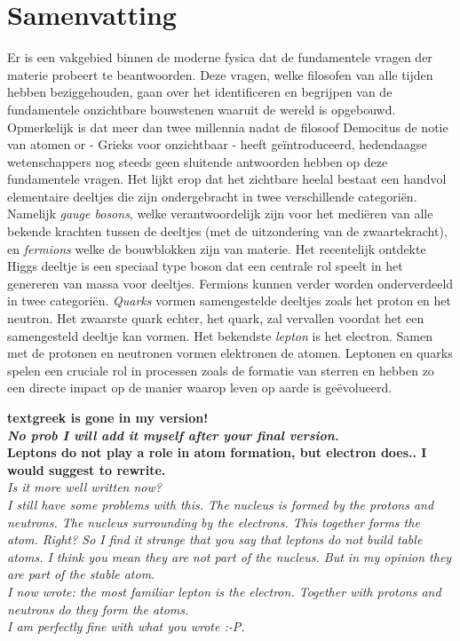 \chapter*{Samenvatting}


Er is een vakgebied binnen de moderne fysica dat de fundamentele vragen der materie probeert te beantwoorden. Deze vragen, welke filosofen van alle tijden hebben beziggehouden, gaan over het identificeren en begrijpen van de fundamentele onzichtbare bouwstenen waaruit de wereld is opgebouwd. Opmerkelijk is dat meer dan twee millennia nadat de filosoof Democitus de notie van atomen or \textgreek{} - Grieks voor onzichtbaar -  heeft ge\"introduceerd, hedendaagse wetenschappers nog steeds geen sluitende antwoorden hebben op deze fundamentele vragen. Het lijkt erop dat het zichtbare heelal bestaat een handvol elementaire deeltjes die zijn ondergebracht in twee verschillende categori\"en. Namelijk {\it gauge bosons}, welke verantwoordelijk zijn voor het medi\"eren van alle bekende krachten tussen de deeltjes (met de uitzondering van de zwaartekracht), en {\it fermions} welke de bouwblokken zijn van materie. Het recentelijk ontdekte Higgs deeltje \cite{higgs-cms,higgs-atlas} is een speciaal type boson dat een centrale rol speelt in het genereren van massa voor deeltjes. Fermions kunnen verder worden onderverdeeld in twee categori\"en. {\it Quarks} vormen samengestelde deeltjes zoals het proton en het neutron. Het zwaarste quark echter, het \tquark quark, zal vervallen voordat het een samengesteld deeltje kan vormen. Het bekendste {\it lepton} is het electron. Samen met de protonen en neutronen vormen elektronen de atomen. Leptonen en quarks spelen een cruciale rol in processen zoals de formatie van sterren en hebben zo een directe impact op de manier waarop leven op aarde is ge\"evolueerd.

\textbf{ \color{red} textgreek is gone in my version!}\\
\textbf{ \color{green} \it No prob I will add it myself after your final version.}\\


\textbf{ Leptons do not play a role in atom formation, but electron does.. I would suggest to rewrite.}\\
{\color{green}\it Is it more well written now?}\\

{\color{red}\it I still have some problems with this. The nucleus is formed by the protons and neutrons.
The nucleus surrounding by the electrons. This together forms the atom. Right? So I find it strange that you say
 that leptons do not build table atoms. I think you mean they are not part of the nucleus. But in my opinion they
 are part of the stable atom.\\ I now wrote: the most familiar lepton is the electron. Together with protons and
  neutrons do they form the atoms.}\\
{\color{green}\it I am perfectly fine with what you wrote :-P.}\\


